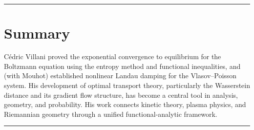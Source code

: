 \begin{center}\rule{0.5\linewidth}{0.5pt}\end{center}

\section*{Summary}

Cédric Villani proved the exponential convergence to equilibrium for the Boltzmann equation using the entropy method and functional inequalities, and (with Mouhot) established nonlinear Landau damping for the Vlasov--Poisson system. His development of optimal transport theory, particularly the Wasserstein distance and its gradient flow structure, has become a central tool in analysis, geometry, and probability. His work connects kinetic theory, plasma physics, and Riemannian geometry through a unified functional-analytic framework.

\begin{center}\rule{0.5\linewidth}{0.5pt}\end{center}
